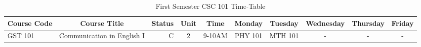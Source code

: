 \documentclass{article}
\begin{document}
\begin{sidewaystable}[h!]
  \begin{center}
 	\caption{First Semester CSC 101 Time-Table}
 	\label{tab:table1}
 	\begin{tabular}{|l|c|r|c|c|c|c|c|c|c|}
 		\hline 
 		\textbf{Course Code} & \textbf{Course Title} & \textbf{Status} & \textbf{Unit} & \textbf{Time} & \textbf{Monday} & \textbf{Tuesday} & \textbf{Wednesday} & \textbf{Thursday} & \textbf{Friday}\\
 		\hline
 		GST 101 & Communication in English I & C & 2 & 9-10AM & PHY 101 & MTH 101 & - & - & -\\
 		
 		\hline
 	\end{tabular}
   \end{center}
\end{sidewaystable}
\end{document}

